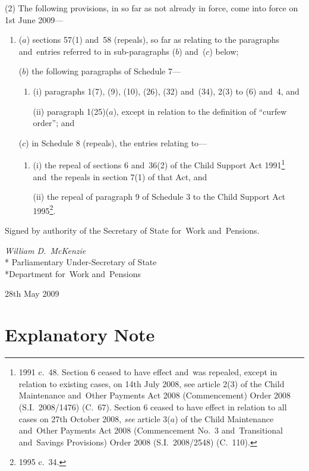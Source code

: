\documentclass[12pt,a4paper]{article}
\begin{document}
(2) The following provisions, in so far as not already in force, come into force on 1st June 2009—
\begin{enumerate}\item[]
($a$) sections 57(1) and~58 (repeals), so far as relating to the paragraphs and~entries referred to in sub-paragraphs ($b$)  and~($c$)  below;

($b$) the following paragraphs of Schedule 7—
\begin{enumerate}\item[]
(i) paragraphs 1(7), (9), (10), (26), (32) and~(34), 2(3) to (6) and~4, and

(ii) paragraph 1(25)($a$), except in relation to the definition of “curfew order”; and
\end{enumerate}

($c$) in Schedule 8 (repeals), the entries relating to—
\begin{enumerate}\item[]
(i) the repeal of sections 6 and~36(2) of the Child Support Act 1991\footnote{1991 c.~48. Section 6 ceased to have effect and~was repealed, except in relation to existing cases, on 14th July 2008, see article 2(3) of the Child Maintenance and~Other Payments Act 2008 (Commencement) Order 2008 (S.I.~2008/1476) (C.~67). Section 6 ceased to have effect in relation to all cases on 27th October 2008, \emph{see} article 3($a$)  of the Child Maintenance and~Other Payments Act 2008 (Commencement No.~3 and~Transitional and~Savings Provisions) Order 2008 (S.I.~2008/2548) (C.~110).} and~the repeals in section 7(1) of that Act, and

(ii) the repeal of paragraph 9 of Schedule 3 to the Child Support Act 1995\footnote{1995 c.~34.}.
\end{enumerate}
\end{enumerate}

\bigskip

\pagebreak[3]

Signed 
by authority of the 
Secretary of State for~Work and~Pensions.

{\raggedleft
\emph{William D.~McKenzie}\\*
Parliamentary Under-Secretary 
of State\\*Department 
for~Work and~Pensions

}

28th May 2009

\small

\part{Explanatory Note}
\end{document}
